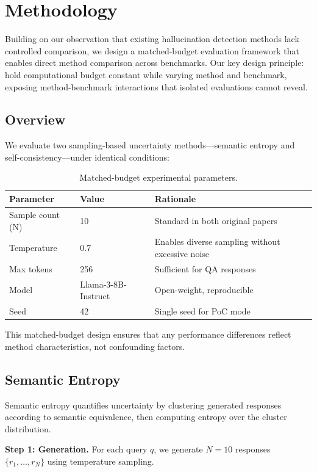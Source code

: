 \section{Methodology}
\label{sec:methodology}

Building on our observation that existing hallucination detection methods lack controlled comparison, we design a matched-budget evaluation framework that enables direct method comparison across benchmarks. Our key design principle: hold computational budget constant while varying method and benchmark, exposing method-benchmark interactions that isolated evaluations cannot reveal.

\subsection{Overview}

We evaluate two sampling-based uncertainty methods---semantic entropy and self-consistency---under identical conditions:

\begin{table}[h]
\centering
\begin{tabular}{@{}lll@{}}
\toprule
Parameter & Value & Rationale \\
\midrule
Sample count (N) & 10 & Standard in both original papers \\
Temperature & 0.7 & Enables diverse sampling without excessive noise \\
Max tokens & 256 & Sufficient for QA responses \\
Model & Llama-3-8B-Instruct & Open-weight, reproducible \\
Seed & 42 & Single seed for PoC mode \\
\bottomrule
\end{tabular}
\caption{Matched-budget experimental parameters.}
\label{tab:parameters}
\end{table}

This matched-budget design ensures that any performance differences reflect method characteristics, not confounding factors.

\subsection{Semantic Entropy}

Semantic entropy quantifies uncertainty by clustering generated responses according to semantic equivalence, then computing entropy over the cluster distribution.

\textbf{Step 1: Generation.} For each query $q$, we generate $N=10$ responses $\{r_1, \ldots, r_N\}$ using temperature sampling.

